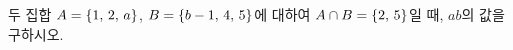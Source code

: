 두 집합 $A=\{1,\mkern3mu 2,\mkern3mu a\}$, $B=\{b-1,\mkern3mu 4,\mkern3mu 5\}$에 대하여 $A\cap B=\{2,\mkern3mu 5\}$일 때, $ab$의 값을 구하시오. 
